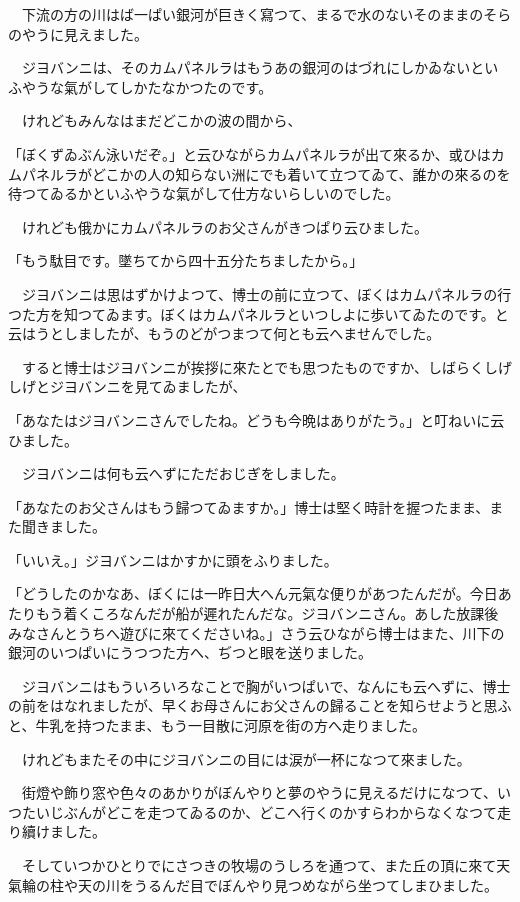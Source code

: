 \documentclass[tate,paper=b6j,jafontsize=9pt]{jlreq}
\begin{document}
　下流の方の川はば一ぱい銀河が巨きく寫つて、まるで水のないそのままのそらのやうに見えました。

　ジヨバンニは、そのカムパネルラはもうあの銀河のはづれにしかゐないといふやうな氣がしてしかたなかつたのです。

　けれどもみんなはまだどこかの波の間から、

「ぼくずゐぶん泳いだぞ。」と云ひながらカムパネルラが出て來るか、或ひはカムパネルラがどこかの人の知らない洲にでも着いて立つてゐて、誰かの來るのを待つてゐるかといふやうな氣がして仕方ないらしいのでした。

　けれども俄かにカムパネルラのお父さんがきつぱり云ひました。

「もう駄目です。墜ちてから四十五分たちましたから。」

　ジヨバンニは思はずかけよつて、博士の前に立つて、ぼくはカムパネルラの行つた方を知つてゐます。ぼくはカムパネルラといつしよに歩いてゐたのです。と云はうとしましたが、もうのどがつまつて何とも云へませんでした。

　すると博士はジヨバンニが挨拶に來たとでも思つたものですか、しばらくしげしげとジヨバンニを見てゐましたが、

「あなたはジヨバンニさんでしたね。どうも今晩はありがたう。」と叮ねいに云ひました。

　ジヨバンニは何も云へずにただおじぎをしました。

「あなたのお父さんはもう歸つてゐますか。」博士は堅く時計を握つたまま、また聞きました。

「いいえ。」ジヨバンニはかすかに頭をふりました。

「どうしたのかなあ、ぼくには一昨日大へん元氣な便りがあつたんだが。今日あたりもう着くころなんだが船が遲れたんだな。ジヨバンニさん。あした放課後みなさんとうちへ遊びに來てくださいね。」さう云ひながら博士はまた、川下の銀河のいつぱいにうつつた方へ、ぢつと眼を送りました。

　ジヨバンニはもういろいろなことで胸がいつぱいで、なんにも云へずに、博士の前をはなれましたが、早くお母さんにお父さんの歸ることを知らせようと思ふと、牛乳を持つたまま、もう一目散に河原を街の方へ走りました。

　けれどもまたその中にジヨバンニの目には涙が一杯になつて來ました。

　街燈や飾り窓や色々のあかりがぼんやりと夢のやうに見えるだけになつて、いつたいじぶんがどこを走つてゐるのか、どこへ行くのかすらわからなくなつて走り續けました。

　そしていつかひとりでにさつきの牧場のうしろを通つて、また丘の頂に來て天氣輪の柱や天の川をうるんだ目でぼんやり見つめながら坐つてしまひました。
\end{document}
